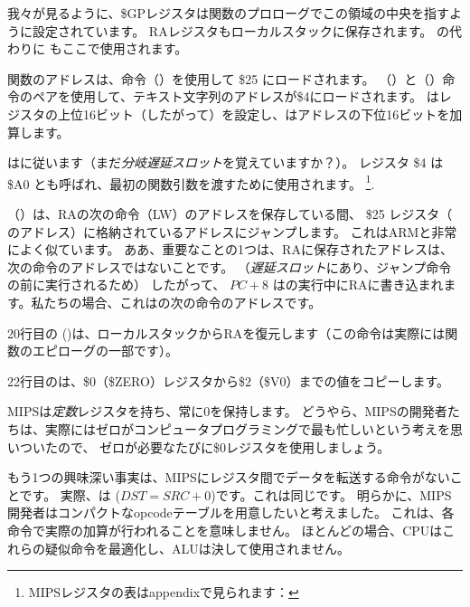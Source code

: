 我々が見るように、\$GPレジスタは関数のプロローグでこの領域の中央を指すように設定されています。 
\ac{RA}レジスタもローカルスタックに保存されます。 
\printf の代わりに \puts もここで使用されます。 

\puts 関数のアドレスは、命令（）を使用して \$25 にロードされます。 
（）と（）命令のペアを使用して、テキスト文字列のアドレスが\$4にロードされます。 
はレジスタの上位16ビット（したがって）を設定し、はアドレスの下位16ビットを加算します。

はに従います（まだ\emph{分岐遅延スロット}を覚えていますか？）。
レジスタ \$4 は \$A0 とも呼ばれ、最初の関数引数を渡すために使用されます。
\footnote{MIPSレジスタの表はappendixで見られます：}.


（）は、\ac{RA}の次の命令（LW）のアドレスを保存している間、
\$25 レジスタ（ \puts のアドレス）に格納されているアドレスにジャンプします。
これはARMと非常によく似ています。
ああ、重要なことの1つは、RAに保存されたアドレスは、次の命令のアドレスではないことです。
（\emph{遅延スロット}にあり、ジャンプ命令の前に実行されるため）
したがって、 $PC + 8$ はの実行中に\ac{RA}に書き込まれます。私たちの場合、これはの次の命令のアドレスです。

20行目の ()は、ローカルスタックから\ac{RA}を復元します（この命令は実際には関数のエピローグの一部です）。

22行目のは、\$0（\$ZERO）レジスタから\$2（\$V0）までの値をコピーします。
\label{MIPS_zero_register}

MIPSは\emph{定数}レジスタを持ち、常に0を保持します。
どうやら、MIPSの開発者たちは、実際にはゼロがコンピュータプログラミングで最も忙しいという考えを思いついたので、
ゼロが必要なたびに\$0レジスタを使用しましょう。

もう1つの興味深い事実は、MIPSにレジスタ間でデータを転送する命令がないことです。 
実際、は ($DST=SRC+0$)です。これは同じです。 
明らかに、MIPS開発者はコンパクトなopcodeテーブルを用意したいと考えました。 
これは、各命令で実際の加算が行われることを意味しません。 
ほとんどの場合、\ac{CPU}はこれらの疑似命令を最適化し、\ac{ALU}は決して使用されません。

